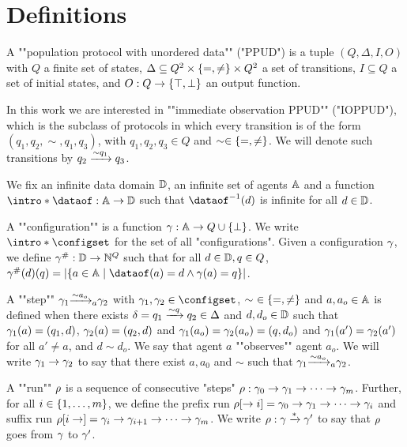 \section{Definitions}
\label{sec:definitions}


\begin{definition}
	A ""population protocol with unordered data"" ("PPUD") is a tuple $(Q, \Delta, I, O)$ with $Q$ a finite set of states,
	$\Delta \subseteq Q^2 \times \set{=, \neq} \times Q^2$ a set of transitions,
	$I \subseteq Q$ a set of initial states, and
	$O : Q \to \set{\top, \bot}$ an output function.
	
	In this work we are interested in ""immediate observation PPUD"" ("IOPPUD"), which is the subclass of protocols in which every transition is of the form $(q_1, q_2, \sim, q_1, q_3)$, with $q_1, q_2, q_3 \in Q$ and $\sim \in \set{=, \neq}$.
	We will denote such transitions by $q_2 \trans{q_1}{\sim} q_3$.
\end{definition}

We fix an infinite data domain $\Dataset$, an infinite set of agents $\Agentset$ and a function $\intro*\dataof : \Agentset \to \Dataset$ such that $\dataof^{-1}(d)$ is infinite for all $d \in \Dataset$. 



A ""configuration"" is a function $\config : \Agentset \to Q \cup \set{\bot}$. We write $\intro*\configset$ for the set of all "configurations". Given a configuration $\config$, we define $\counting{\config} : \Dataset \to \nats^Q$ such that for all $d \in \Dataset, q \in Q$, $\counting{\config}(d)(q) = \size{\set{a \in \Agentset \mid \dataof(a) = d \land \config(a) =q}}$.


A ""step"" $\config_1 \step{\sim}{a}{a_o} \config_2$ with $\config_1, \config_2 \in \configset$, $\sim~ \in \set{=, \neq}$ and $a, a_o \in \Agentset$ is defined when there exists  $\delta = q_1 \trans{q}{\sim} q_2 \in \Delta$ and $d, d_o \in \Dataset$ such that $\config_1(a) = (q_1, d)$, $\config_2(a) = (q_2, d)$ and $\config_1(a_o) = \config_2(a_o) = (q, d_o)$ and $\config_1(a') = \config_2(a')$ for all $a' \neq a$, and $d \sim d_o$.
We say that agent $a$ ""observes"" agent $a_o$. 
We will write $\config_1 \to \config_2$ to say that there exist $a, a_0$ and $\sim$ such that $\config_1 \step{\sim}{a}{a_o} \config_2$.

A ""run"" $\run$ is a sequence of consecutive "steps" $\run: \config_0 \to \config_1 \to \cdots \to  \config_m$.
Further, for all $i \in \nset{1}{m}$, we define the prefix run $\prefixrun{\run}{i} = \config_0 \to \config_1 \to \cdots \to  \config_i$ and suffix run $\suffixrun{\run}{i} = \config_i \to \config_{i+1} \to \cdots \to  \config_m$. We write $\run : \config \xrightarrow{*} \config'$ to say that $\run$ goes from $\config$ to $\config'$. 

